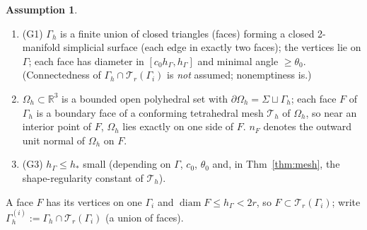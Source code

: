\documentclass[11pt]{article}
\theoremstyle{definition}
\newtheorem{assumption}[theorem]{Assumption}
\newcommand{\R}{\mathbb R}
\newcommand{\hG}{h_\Gamma}
\newcommand{\Gh}{\Gamma_h}
\newcommand{\Oh}{\Omega_h}
\newcommand{\Th}{\mathcal T_h}
\DeclareMathOperator{\diam}{diam}
\begin{document}
\begin{assumption}\label{ass}
\begin{enumerate}[label=(\alph*)]
\item (G1) $\Gh$ is a finite union of closed triangles (faces) forming a closed 2-manifold simplicial surface (each edge in exactly two faces); the vertices lie on $\Gamma$; each face has diameter in $[c_0\hG,\hG]$ and minimal angle $\ge\theta_0$. (Connectedness of $\Gh\cap\mathcal T_r(\Gamma_i)$ is \emph{not} assumed; nonemptiness is.)
\item $\Oh\subset\R^3$ is a bounded open polyhedral set with $\partial\Oh=\Sigma\sqcup\Gh$; each face $F$ of $\Gh$ is a boundary face of a conforming tetrahedral mesh $\Th$ of $\Oh$, so near an interior point of $F$, $\Oh$ lies exactly on one side of $F$. $n_F$ denotes the outward unit normal of $\Oh$ on $F$.
\item (G3) $\hG\le h_\ast$ small (depending on $\Gamma$, $c_0$, $\theta_0$ and, in Thm~\ref{thm:mesh}, the shape-regularity constant of $\Th$).
\end{enumerate}
\end{assumption}
A face $F$ has its vertices on one $\Gamma_i$ and $\diam F\le\hG<2r$, so $F\subset\mathcal T_r(\Gamma_i)$; write $\Gamma_h^{(i)}:=\Gh\cap\mathcal T_r(\Gamma_i)$ (a union of faces).
\end{document}
